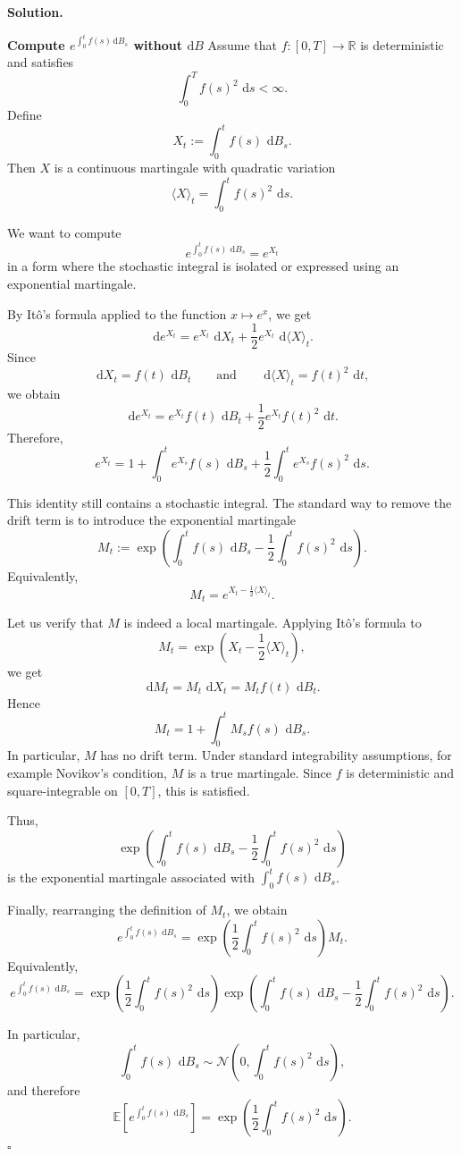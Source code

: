\documentclass[11pt]{article}
\theoremstyle{plain}
\newcommand{\E}{\mathbb{E}}
\newcommand{\dd}{\,\mathrm{d}}
\newcommand{\1}{\mathbf{1}}
\theoremstyle{definition}
\newenvironment{solution}
{\par\medskip\noindent\textbf{Solution.}\par\medskip}
{\hfill$\square$\par\medskip}
\begin{document}
\begin{solution}
\textbf{Compute $e^{\int_0^t f(s)\,\mathrm{d} B_s}$ without $\mathrm{d} B$}
Assume that $f:[0,T]\to\mathbb{R}$ is deterministic and satisfies
\[
\int_0^T f(s)^2\,\dd s<\infty.
\]
Define
\[
X_t:=\int_0^t f(s)\,\dd B_s.
\]
Then $X$ is a continuous martingale with quadratic variation
\[
\langle X\rangle_t
=
\int_0^t f(s)^2\,\dd s.
\]

We want to compute
\[
e^{\int_0^t f(s)\,\dd B_s}
=
e^{X_t}
\]
in a form where the stochastic integral is isolated or expressed using an exponential martingale.

By It\^o's formula applied to the function $x\mapsto e^x$, we get
\[
\dd e^{X_t}
=
e^{X_t}\,\dd X_t
+
\frac12 e^{X_t}\,\dd\langle X\rangle_t.
\]
Since
\[
\dd X_t=f(t)\,\dd B_t
\qquad\text{and}\qquad
\dd\langle X\rangle_t=f(t)^2\,\dd t,
\]
we obtain
\[
\dd e^{X_t}
=
e^{X_t}f(t)\,\dd B_t
+
\frac12 e^{X_t}f(t)^2\,\dd t.
\]
Therefore,
\[
e^{X_t}
=
1
+
\int_0^t e^{X_s}f(s)\,\dd B_s
+
\frac12\int_0^t e^{X_s}f(s)^2\,\dd s.
\]

This identity still contains a stochastic integral. The standard way to remove the drift term is to introduce the exponential martingale
\[
M_t
:=
\exp\left(
\int_0^t f(s)\,\dd B_s
-
\frac12\int_0^t f(s)^2\,\dd s
\right).
\]
Equivalently,
\[
M_t
=
e^{X_t-\frac12\langle X\rangle_t}.
\]

Let us verify that $M$ is indeed a local martingale. Applying It\^o's formula to
\[
M_t=\exp\left(X_t-\frac12\langle X\rangle_t\right),
\]
we get
\[
\dd M_t
=
M_t\,\dd X_t
=
M_t f(t)\,\dd B_t.
\]
Hence
\[
M_t
=
1+\int_0^t M_s f(s)\,\dd B_s.
\]
In particular, $M$ has no drift term. Under standard integrability assumptions, for example Novikov's condition, $M$ is a true martingale. Since $f$ is deterministic and square-integrable on $[0,T]$, this is satisfied.

Thus,
\[
\boxed{
\exp\left(
\int_0^t f(s)\,\dd B_s
-
\frac12\int_0^t f(s)^2\,\dd s
\right)
}
\]
is the exponential martingale associated with $\int_0^t f(s)\,\dd B_s$.

Finally, rearranging the definition of $M_t$, we obtain
\[
\boxed{
e^{\int_0^t f(s)\,\dd B_s}
=
\exp\left(
\frac12\int_0^t f(s)^2\,\dd s
\right)
M_t.
}
\]
Equivalently,
\[
\boxed{
e^{\int_0^t f(s)\,\dd B_s}
=
\exp\left(
\frac12\int_0^t f(s)^2\,\dd s
\right)
\exp\left(
\int_0^t f(s)\,\dd B_s
-
\frac12\int_0^t f(s)^2\,\dd s
\right).
}
\]

In particular,
\[
\int_0^t f(s)\,\dd B_s
\sim
\mathcal{N}\left(
0,\int_0^t f(s)^2\,\dd s
\right),
\]
and therefore
\[
\E\left[
e^{\int_0^t f(s)\,\dd B_s}
\right]
=
\exp\left(
\frac12\int_0^t f(s)^2\,\dd s
\right).
\]
\end{solution}
\end{document}
